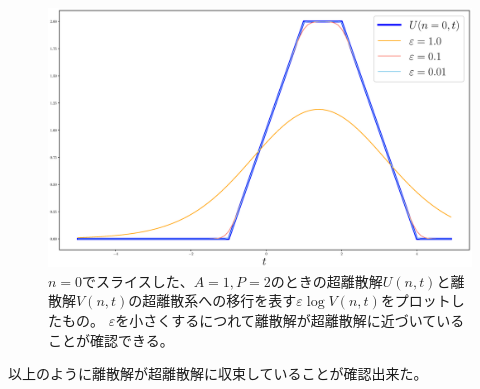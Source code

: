 \documentclass{jsarticle}
\begin{document}
\begin{enumerate}
\begin{figure}[H]
\begin{center}
\includegraphics[width=14cm]{lv_a1p2_n0.eps}
\caption{$n=0$でスライスした、$A=1,P=2$のときの超離散解$U(n,t)$と離散解$V(n,t)$の超離散系への移行を表す$\varepsilon\log V(n,t)$をプロットしたもの。
$\varepsilon$を小さくするにつれて離散解が超離散解に近づいていることが確認できる。}
\label{fig:ud_a1p2_n0}
\end{center}
\end{figure}

以上のように離散解が超離散解に収束していることが確認出来た。
\end{enumerate}
\end{document}

